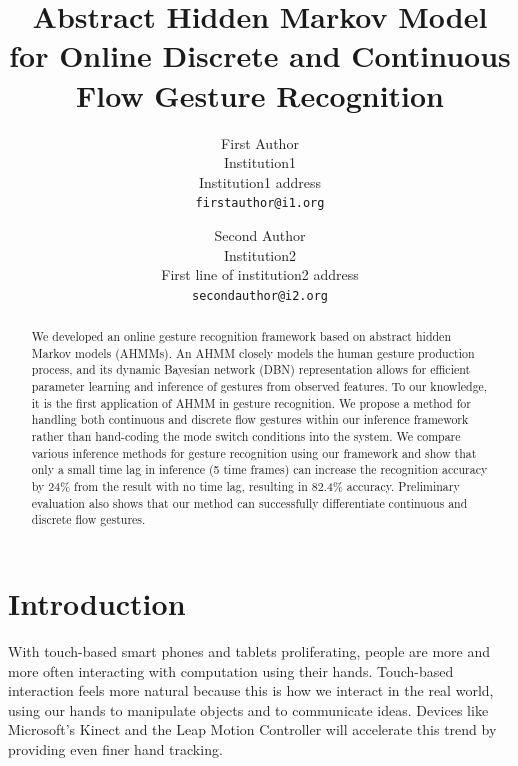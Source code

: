 \documentclass[10pt,twocolumn,letterpaper]{article}
\begin{document}
\title{Abstract Hidden Markov Model for Online Discrete and Continuous Flow Gesture Recognition}

\author{First Author\\
Institution1\\
Institution1 address\\
{\tt\small firstauthor@i1.org}
\and
Second Author\\
Institution2\\
First line of institution2 address\\
{\tt\small secondauthor@i2.org}
}

\maketitle

\begin{abstract}
We developed an online gesture recognition framework based on abstract hidden Markov  
models (AHMMs). An AHMM closely models the human gesture production process, and its dynamic
Bayesian network (DBN) representation allows for efficient parameter learning and inference
of gestures from observed features. To our knowledge, it is the first application
of AHMM in gesture recognition. We propose a method for handling both continuous and discrete
flow gestures within our inference framework rather than hand-coding the mode switch conditions into the system. 
We compare various inference methods for gesture recognition using our framework and
show that only a small time lag in inference (5 time frames) can increase the recognition
accuracy by 24\% from the result with no time lag, resulting in 82.4\% accuracy. 
Preliminary evaluation also shows that our method can successfully differentiate continuous and discrete flow gestures. 

\end{abstract}

\section{Introduction}\label{sec:intro}
With touch-based smart phones and tablets proliferating, people are more and more often 
interacting with computation using their hands. Touch-based interaction feels more
natural because this is how we interact in the real world, using our hands
to manipulate objects and to communicate ideas. Devices like Microsoft's 
Kinect and the Leap Motion Controller
will accelerate this trend by providing even finer hand tracking. 
\end{document}

